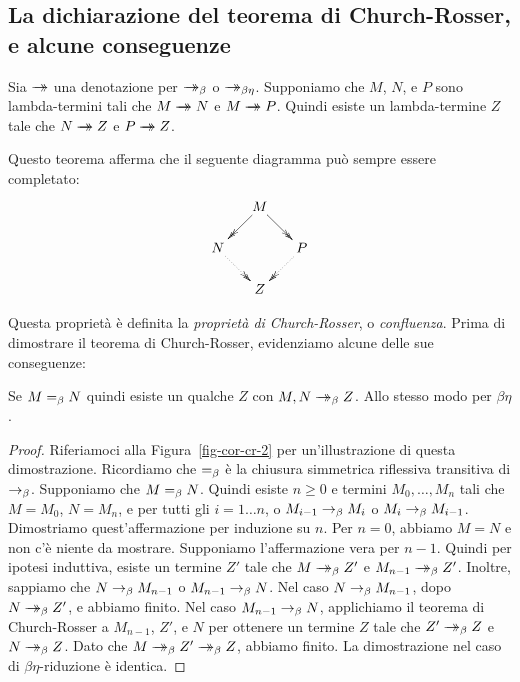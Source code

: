 \documentclass{article}
\begin{document}
\subsection{La dichiarazione del teorema di Church-Rosser, e alcune conseguenze}

\begin{un-theorem}\label{thm-church-rosser}
  Sia $\mathrel{\rightarrow\!\!\!\!\!\rightarrow}$ una denotazione per $\mathrel{\rightarrow\!\!\!\!\!\rightarrow}_{\beta}$ o $\mathrel{\rightarrow\!\!\!\!\!\rightarrow}_{\beta\eta}$.  Supponiamo che 
  $M$, $N$, e $P$ sono lambda-termini tali che $M\mathrel{\rightarrow\!\!\!\!\!\rightarrow} N$ e $M\mathrel{\rightarrow\!\!\!\!\!\rightarrow} P$. Quindi
  esiste un lambda-termine $Z$ tale che $N\mathrel{\rightarrow\!\!\!\!\!\rightarrow} Z$ e $P\mathrel{\rightarrow\!\!\!\!\!\rightarrow} Z$.
\end{un-theorem}

Questo teorema afferma che il seguente diagramma
pu\`o sempre essere completato:
\[ \xymatrix@dr{M\ar@{->>}[r]\ar@{->>}[d] & P\ar@{.>>}[d]\\ N\ar@{.>>}[r] & Z}
\]

Questa propriet\`a \`e definita la {\em propriet\`a di Church-Rosser}, o {\em
	confluenza}. Prima di dimostrare il teorema di Church-Rosser,
evidenziamo alcune delle sue conseguenze:

\begin{corollary}\label{cor-cr-2}
  Se $M=_{\beta} N$ quindi esiste un qualche $Z$ con $M,N\mathrel{\rightarrow\!\!\!\!\!\rightarrow}_{\beta}
  Z$. Allo stesso modo per $\beta\eta$.
\end{corollary}

\begin{proof}
  Riferiamoci alla Figura~\ref{fig-cor-cr-2} per un'illustrazione
  di questa dimostrazione. Ricordiamo che $=_{\beta}$ \`e la chiusura simmetrica riflessiva
  transitiva di $\rightarrow_{\beta}$. Supponiamo che $M=_{\beta} N$. Quindi esiste $n\geq
  0$ e termini $M_0,\ldots,M_n$ tali che $M=M_0$, $N=M_n$, e per
  tutti gli $i=1\ldots n$, o $M_{i-1}\rightarrow_{\beta} M_{i}$ o $M_{i}\rightarrow_{\beta}
  M_{i-1}$.  Dimostriamo quest'affermazione per induzione su $n$. Per $n=0$, abbiamo $M=N$ e 
  non c'\`e niente da mostrare. Supponiamo l'affermazione vera per $n-1$. 
  Quindi per ipotesi induttiva, esiste un termine
  $Z'$ tale che $M\mathrel{\rightarrow\!\!\!\!\!\rightarrow}_{\beta} Z'$ e $M_{n-1}\mathrel{\rightarrow\!\!\!\!\!\rightarrow}_{\beta} Z'$. Inoltre, sappiamo
  che $N\rightarrow_{\beta} M_{n-1}$ o $M_{n-1}\rightarrow_{\beta} N$. Nel caso $N\rightarrow_{\beta}
  M_{n-1}$, dopo $N\mathrel{\rightarrow\!\!\!\!\!\rightarrow}_{\beta} Z'$, e abbiamo finito. Nel caso $M_{n-1}\rightarrow_{\beta}
  N$, applichiamo il teorema di Church-Rosser a $M_{n-1}$, $Z'$, e $N$
  per ottenere un termine $Z$ tale che $Z'\mathrel{\rightarrow\!\!\!\!\!\rightarrow}_{\beta} Z$ e $N\mathrel{\rightarrow\!\!\!\!\!\rightarrow}_{\beta} Z$. Dato che
  $M\redbs Z'\redbs Z$, abbiamo finito. La dimostrazione nel caso di
  $\beta\eta$-riduzione \`e identica.\eot
\end{proof}
\end{document}

